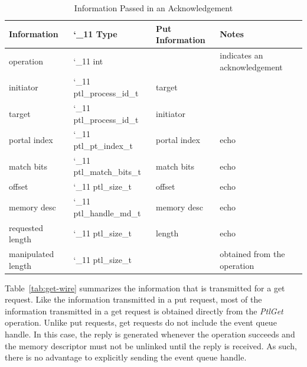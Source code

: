 \documentclass{sand-report}
\def\makeunderletter{\catcode`_11\relax}
\begin{document}
\begin{table}[htbp]
  \begin{center}\small
    \begin{tabular}{l>{\ttfamily\makeunderletter}lll}
Information        & \textrm{Type}    & Put Information               & Notes \\ \hline
operation          & int              &              & indicates an acknowledgement \\
initiator          & ptl_process_id_t & target       & \\
target             & ptl_process_id_t & initiator    & \\
portal index       & ptl_pt_index_t   & portal index & echo \\
match bits         & ptl_match_bits_t & match bits   & echo \\
offset             & ptl_size_t       & offset       & echo \\
memory desc        & ptl_handle_md_t  & memory desc  & echo \\
requested length   & ptl_size_t       & length       & echo \\
manipulated length & ptl_size_t       &              & obtained from the operation \\
    \end{tabular}
    \caption{Information Passed in an Acknowledgement}
    \label{tab:ack-wire}
  \end{center}
\end{table}

Table~\ref{tab:get-wire} summarizes the information that is
transmitted for a get request.  Like the information transmitted in a
put request, most of the information transmitted in a get request is
obtained directly from the \emph{PtlGet} operation.  Unlike put
requests, get requests do not include the event queue handle.  In this 
case, the reply is generated whenever the operation succeeds and the
memory descriptor must not be unlinked until the reply is received.
As such, there is no advantage to explicitly sending the event queue
handle.
\end{document}
